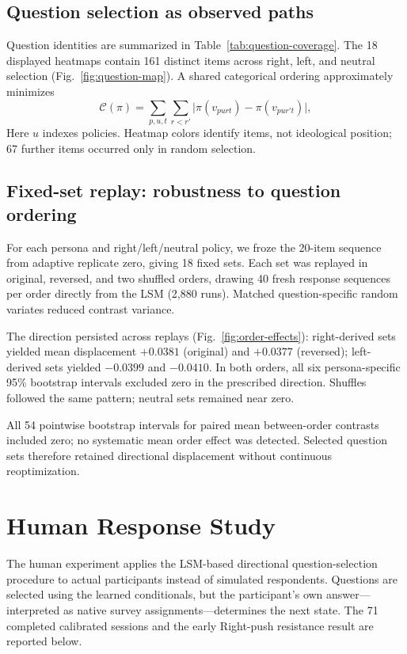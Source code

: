 \documentclass[technote,10pt]{IEEEtran}
\begin{document}
\subsection{Question selection as observed paths}
Question identities are summarized in Table~\ref{tab:question-coverage}. The 18 displayed heatmaps contain 161 distinct items across right, left, and neutral selection (Fig.~\ref{fig:question-map}). A shared categorical ordering approximately minimizes
\begin{equation}
\mathcal C(\pi)=\sum_{p,u,t}\sum_{r<r'}
\big|\pi(v_{purt})-\pi(v_{pur't})\big|,
\label{eq:question-seriation}
\end{equation}
Here $u$ indexes policies. Heatmap colors identify items, not ideological position; 67 further items occurred only in random selection.



\subsection{Fixed-set replay: robustness to question ordering}
For each persona and right/left/neutral policy, we froze the 20-item sequence from adaptive replicate zero, giving 18 fixed sets. Each set was replayed in original, reversed, and two shuffled orders, drawing 40 fresh response sequences per order directly from the LSM (2,880 runs). Matched question-specific random variates reduced contrast variance.

The direction persisted across replays (Fig.~\ref{fig:order-effects}): right-derived sets yielded mean displacement $+0.0381$ (original) and $+0.0377$ (reversed); left-derived sets yielded $-0.0399$ and $-0.0410$. In both orders, all six persona-specific 95\% bootstrap intervals excluded zero in the prescribed direction. Shuffles followed the same pattern; neutral sets remained near zero.

All 54 pointwise bootstrap intervals for paired mean between-order contrasts included zero; no systematic mean order effect was detected. Selected question sets therefore retained directional displacement without continuous reoptimization.

\section{Human Response Study}
The human experiment applies the LSM-based directional question-selection
procedure to actual participants instead of simulated respondents.
Questions are selected using the learned conditionals, but the participant's
own answer---interpreted as native survey assignments---determines the
next state. The 71 completed calibrated sessions and the early
Right-push resistance result are reported below.
\end{document}
